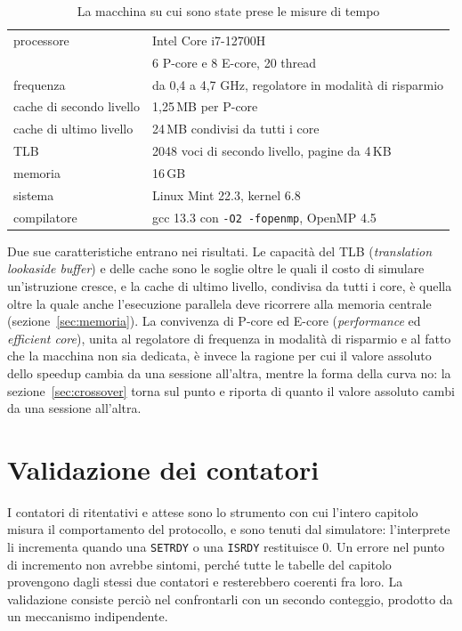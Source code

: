 \begin{table}[htbp]
    \centering
    \begin{tabular}{ll}
        \toprule
        processore & Intel Core i7-12700H \\
                   & 6 P-core e 8 E-core, 20 thread \\
        frequenza  & da 0,4 a 4,7 GHz, regolatore in modalità di risparmio \\
        cache di secondo livello & 1,25\,MB per P-core \\
        cache di ultimo livello & 24\,MB condivisi da tutti i core \\
        TLB & 2048 voci di secondo livello, pagine da 4\,KB \\
        memoria    & 16\,GB \\
        sistema    & Linux Mint 22.3, kernel 6.8 \\
        compilatore & gcc 13.3 con \texttt{-O2 -fopenmp}, OpenMP 4.5 \\
        \bottomrule
    \end{tabular}
    \caption{La macchina su cui sono state prese le misure di tempo}
    \label{tab:macchina}
\end{table}

Due sue caratteristiche entrano nei risultati. Le capacità del
TLB (\emph{translation lookaside buffer}) e delle cache sono le soglie oltre le quali il
costo di simulare un'istruzione cresce, e la cache di ultimo livello, condivisa da tutti i core, è quella oltre la quale anche l'esecuzione
parallela deve ricorrere alla memoria centrale (sezione~\ref{sec:memoria}). La
convivenza di P-core ed E-core (\emph{performance} ed \emph{efficient core}), unita al regolatore di
frequenza in modalità di risparmio e al fatto che la macchina non sia dedicata,
è invece la ragione per cui il valore assoluto dello speedup cambia da una
sessione all'altra, mentre la forma della curva no: la
sezione~\ref{sec:crossover} torna sul punto e riporta di quanto il valore
assoluto cambi da una sessione all'altra.

\section{Validazione dei contatori}
\label{sec:taratura}

I contatori di ritentativi e attese sono lo strumento con cui l'intero capitolo
misura il comportamento del protocollo, e sono tenuti dal simulatore:
l'interprete li incrementa quando una \texttt{SETRDY} o una \texttt{ISRDY}
restituisce 0. Un errore nel punto di incremento non avrebbe sintomi, perché
tutte le tabelle del capitolo provengono dagli stessi due contatori e
resterebbero coerenti fra loro. La validazione consiste perciò nel confrontarli
con un secondo conteggio, prodotto da un meccanismo indipendente.

